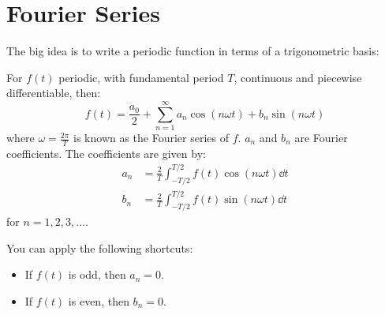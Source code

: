 \documentclass{article}
\begin{document}
    \section{Fourier Series}
    The big idea is to write a periodic function in terms of a trigonometric basis:
    \begin{theorem}
        For $f(t)$ periodic, with fundamental period $T$, continuous and piecewise differentiable, then:
        \begin{equation}
            f(t)=\frac{a_0}{2}+\sum_{n=1}^\infty a_n\cos (n\omega t) + b_n\sin(n\omega t)
        \end{equation}
        where $\omega = \frac{2\pi}{T}$ is known as the Fourier series of $f$. $a_n$ and $b_n$ are Fourier coefficients. The coefficients are given by:
        \begin{align}
            a_n &= \frac{2}{T}\int_{-T/2}^{T/2} f(t)\cos(n\omega t)\dd{t} \\ 
            b_n &= \frac{2}{T}\int_{-T/2}^{T/2} f(t)\sin(n\omega t)\dd{t}
        \end{align}
        for $n=1,2,3,\dots$.
    \end{theorem}
    You can apply the following shortcuts:
    \begin{itemize}
        \item If $f(t)$ is odd, then $a_n=0$.
        \item If $f(t)$ is even, then $b_n=0$.
    \end{itemize}
\end{document}
